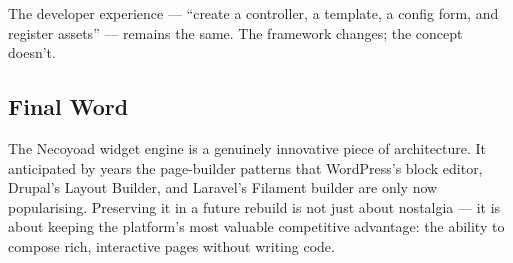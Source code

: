 \documentclass[11pt,a4paper]{article}
\begin{document}
The developer experience --- ``create a controller, a template, a
config form, and register assets'' --- remains the same. The
framework changes; the concept doesn't.

\subsection{Final Word}

The Necoyoad widget engine is a genuinely innovative piece of
architecture. It anticipated by years the page-builder patterns that
WordPress's block editor, Drupal's Layout Builder, and Laravel's
Filament builder are only now popularising. Preserving it in a future
rebuild is not just about nostalgia --- it is about keeping the
platform's most valuable competitive advantage: the ability to compose
rich, interactive pages without writing code.
\end{document}
